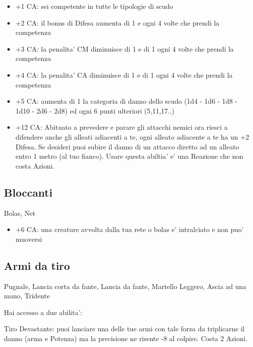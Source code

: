 \documentclass[a4paper,11pt,twoside,openany]{dndbook}
\begin{document}
\begin{itemize}
	\item +1 CA: sei competente in tutte le tipologie di scudo

\item +2 CA: il bonus di Difesa aumenta di 1 e ogni 4 volte che prendi la competenza

\item +3 CA: la penalita' CM diminuisce di 1 e di 1 ogni 4 volte che prendi la competenza

\item +4 CA: la penalita' CA diminuisce di 1 e di 1 ogni 4 volte che prendi la competenza

\item +5 CA: aumenta di 1 la categoria di danno dello scudo (1d4 - 1d6 - 1d8 - 1d10 - 2d6 - 2d8) ed ogni 6 punti ulteriori (5,11,17..)

\item +12 CA: Abituato a prevedere e parare gli attacchi nemici ora riesci a difendere anche gli alleati adiacenti a te, ogni alleato adiacente a te ha un +2 Difesa. Se desideri puoi subire il danno di un attacco diretto ad un alleato entro 1 metro (al tuo fianco). Usare questa abiltia' e' una Reazione che non costa Azioni.

\end{itemize}

\subsection{Bloccanti} Bolas, Net

\begin{itemize}
	\item +6 CA: una creature avvolta dalla tua rete o bolas e' intralciato
e non puo' muoversi

\end{itemize}

\subsection{Armi da tiro} Pugnale, Lancia corta da fante, Lancia da fante, Martello Leggero, Ascia ad una mano, Tridente

Hai accesso a due abilita':

Tiro Devastante: puoi lanciare una delle tue armi con tale forza da triplicarne il danno (arma e Potenza) ma la precisione ne risente -8 al colpire. Costa 2 Azioni.
\end{document}
